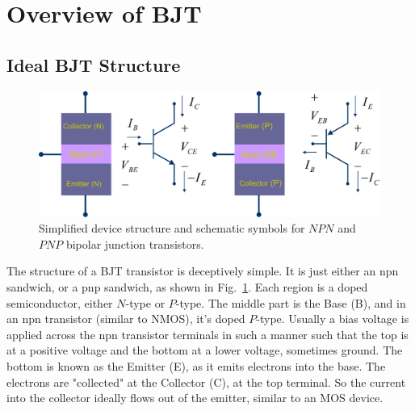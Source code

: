 \section{Overview of BJT}
\subsection{Ideal BJT Structure}
\begin{figure}[tb]
\centering
\includegraphics[width=.85\columnwidth]{slide2_bjt_overview}
\caption{Simplified device structure and schematic symbols for $NPN$ and $PNP$ bipolar junction transistors.}
\label{fig:slide2_bjt_overview}
\end{figure}
The structure of a BJT transistor is deceptively simple.  It is just either an npn sandwich, or a pnp sandwich, as shown in Fig.~\ref{fig:slide2_bjt_overview}.  Each region is a doped semiconductor, either $N$-type or $P$-type.  The middle part is the Base (B), and in an npn transistor (similar to NMOS), it's doped $P$-type.  Usually a bias voltage is applied across the npn transistor terminals in such a manner such that the top is at a positive voltage and the bottom at a lower voltage, sometimes ground.  The bottom is known as the Emitter (E), as it emits electrons into the base.  The electrons are "collected" at the Collector (C), at the top terminal.  So the current into the collector ideally flows out of the emitter, similar to an MOS device.
